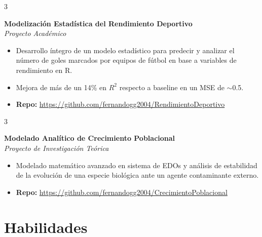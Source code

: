 \documentclass[10pt, letterpaper]{article}
\newenvironment{highlights}{
    \begin{itemize}[
        topsep=0.10 cm,
        parsep=0.10 cm,
        partopsep=0pt,
        itemsep=0pt,
        leftmargin=0.4 cm + 10pt
    ]
}{
    \end{itemize}
} %
\newenvironment{threecolentry}[3][]{
    \onecolentry
    \def\thirdColumn{#3}
    \setcolumnwidth{0 cm, \fill, 4.5 cm}
    \begin{paracol}{3}
    \noindent{\raggedright #2}\switchcolumn
}{
    \switchcolumn \raggedleft \thirdColumn
    \end{paracol}
    \endonecolentry
} %
\begin{document}
        \medskip

        \begin{threecolentry}{}{
        2025
        }
            \textbf{Modelización Estadística del Rendimiento Deportivo}\\
            \textit{Proyecto Académico}
            \begin{highlights}
                \item Desarrollo íntegro de un modelo estadístico para predecir y analizar el número de goles marcados por equipos de fútbol en base a variables de rendimiento en R.
                \item Mejora de más de un 14\% en $R^2$ respecto a baseline en un MSE de $\sim$0.5.
                \item \textbf{Repo: } \url{https://github.com/fernandogg2004/RendimientoDeportivo}
            \end{highlights}
        \end{threecolentry}

        \newpage

        \begin{threecolentry}{}{
        2024
        }
            \textbf{Modelado Analítico de Crecimiento Poblacional}\\
            \textit{Proyecto de Investigación Teórica}
            \begin{highlights}
                \item  Modelado matemático avanzado en sistema de EDOs y análisis de estabilidad de la evolución de una especie biológica ante un agente contaminante externo.
                \item \textbf{Repo: } \url{https://github.com/fernandogg2004/CrecimientoPoblacional}
            \end{highlights}
        \end{threecolentry}

    \medskip
   
    \section{Habilidades}
\end{document}
